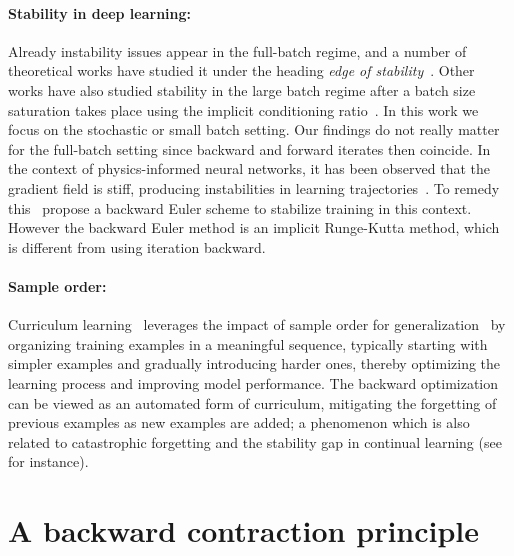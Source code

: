 \documentclass[10pt]{article} %
\theoremstyle{plain}
\theoremstyle{definition}
\theoremstyle{remark}
\begin{document}
\paragraph{Stability in deep learning:}
Already instability issues appear in the full-batch regime, and a number of theoretical works have studied it under the heading \emph{edge of stability}~\cite{cheng2020stochastic, Wu2024large_stepsize, cai2024large_stepsize}. Other works have also studied stability in the large batch regime after a batch size saturation takes place using the implicit conditioning ratio~\cite{lee2022trajectory,Agarwala2024High}. In this work we focus on the stochastic or small batch setting. Our findings do not really matter for the full-batch setting since backward and forward iterates then coincide. In the context of physics-informed neural networks, it has been observed that the gradient field is stiff, producing instabilities in learning trajectories~\cite{Wang2020UnderstandingAM}. To remedy this~\cite{li2023implicitstochasticgradientdescent} propose a backward Euler scheme to stabilize training in this context. However the backward Euler method is an implicit Runge-Kutta method, which is different from using iteration backward.

\paragraph{Sample order:}
Curriculum learning~\cite{soviany2022curriculumlearningsurvey} leverages the impact of sample order for generalization~\cite{mange19dataorder} by organizing training examples in a meaningful sequence, typically starting with simpler examples and gradually introducing harder ones, thereby optimizing the learning process and improving model performance. The backward optimization can be viewed as an automated form of curriculum, mitigating the forgetting of previous examples as new examples are added; a phenomenon which is also related to catastrophic forgetting and the stability gap in continual learning (see~\citet{lange2023continual} for instance).


\section{A backward contraction principle} \label{sec:contractions}
\end{document}
